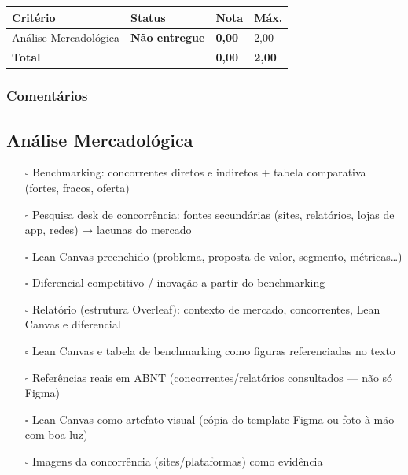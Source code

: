 \documentclass[
  sigconf,
  nonacm, %
  language=portuguese
]{acmart}
\newcommand{\statuswarn}[1]{{\small\bfseries\color{cwarn}#1}}
\begin{document}
\begin{tabular}{@{} L{2.6cm} C{2.5cm} C{1.1cm} C{1.1cm} @{}}
\toprule
\textbf{Critério} & \textbf{Status} & \textbf{Nota} & \textbf{Máx.} \\
\midrule
Análise Mercadológica & \statuswarn{Não entregue} & \textbf{0,00} & 2,00 \\
\midrule
\textbf{Total} & & \textbf{\color{cred}0,00} & \textbf{2,00} \\
\bottomrule
\end{tabular}

\subsubsection*{Comentários}

\subsection{Análise Mercadológica}

\noindent\statuswarn{0,00\,/\,2,00 pts · Não entregue}

\begin{itemize}[leftmargin=14pt,itemsep=1pt,topsep=3pt,parsep=0pt]
  \item[$\square$] {\small\textcolor{cmuted}{Benchmarking: concorrentes diretos e indiretos + tabela comparativa (fortes, fracos, oferta)}}
  \item[$\square$] {\small\textcolor{cmuted}{Pesquisa desk de concorrência: fontes secundárias (sites, relatórios, lojas de app, redes) → lacunas do mercado}}
  \item[$\square$] {\small\textcolor{cmuted}{Lean Canvas preenchido (problema, proposta de valor, segmento, métricas…)}}
  \item[$\square$] {\small\textcolor{cmuted}{Diferencial competitivo / inovação a partir do benchmarking}}
  \item[$\square$] {\small\textcolor{cmuted}{Relatório (estrutura Overleaf): contexto de mercado, concorrentes, Lean Canvas e diferencial}}
  \item[$\square$] {\small\textcolor{cmuted}{Lean Canvas e tabela de benchmarking como figuras referenciadas no texto}}
  \item[$\square$] {\small\textcolor{cmuted}{Referências reais em ABNT (concorrentes/relatórios consultados — não só Figma)}}
  \item[$\square$] {\small\textcolor{cmuted}{Lean Canvas como artefato visual (cópia do template Figma ou foto à mão com boa luz)}}
  \item[$\square$] {\small\textcolor{cmuted}{Imagens da concorrência (sites/plataformas) como evidência}}
\end{itemize}
\end{document}
